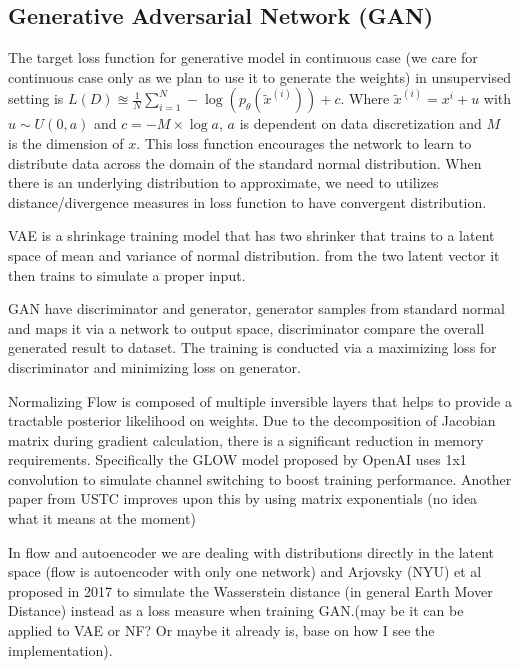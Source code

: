 \documentclass[honours,12pt]{unswthesis}
\numberwithin{equation}{section}
\begin{document}
\subsection{Generative Adversarial Network (GAN) }

The target loss function for generative model in continuous case (we care for continuous case only as we plan to use it to generate the weights) in unsupervised setting is $L(D) \approxeq \frac{1}{N}\sum_{i=1}^N - \log(p_\theta(\tilde{x}^{(i)}))+c$. Where $\tilde{x}^{(i)} = x^{i}+u$ with $u\sim U(0,a)$ and $c=-M\times \log{a}$, $a$ is dependent on data discretization and $M$ is the dimension of $x$. This loss function encourages the network to learn to distribute data across the domain of the standard normal distribution. When there is an underlying distribution to approximate, we need to utilizes distance/divergence measures in loss function to have convergent distribution.

VAE is a shrinkage training model that has two shrinker that trains to a latent space of mean and variance of normal distribution.
from the two latent vector it then trains to simulate a proper input.

GAN have discriminator and generator, generator samples from standard normal and maps it via a network to output space, discriminator compare the overall generated result to dataset. The training is conducted via a maximizing loss for discriminator and minimizing loss on generator.

Normalizing Flow is composed of multiple inversible layers that helps to provide a tractable posterior likelihood on weights. Due to the decomposition of Jacobian matrix during gradient calculation, there is a significant reduction in memory requirements. Specifically the GLOW model proposed by OpenAI \cite{openai2018glow} uses 1x1 convolution to simulate channel switching to boost training performance. Another paper from USTC improves upon this by using matrix exponentials (no idea what it means at the moment)

In flow and autoencoder we are dealing with distributions directly in the latent space (flow is autoencoder with only one network) and Arjovsky (NYU) \cite{PMLR2017_WGAN} et al proposed in 2017 to simulate the Wasserstein distance (in general Earth Mover Distance) instead as a loss measure when training GAN.(may be it can be applied to VAE or NF? Or maybe it already is, base on how I see the implementation). 
\end{document}
